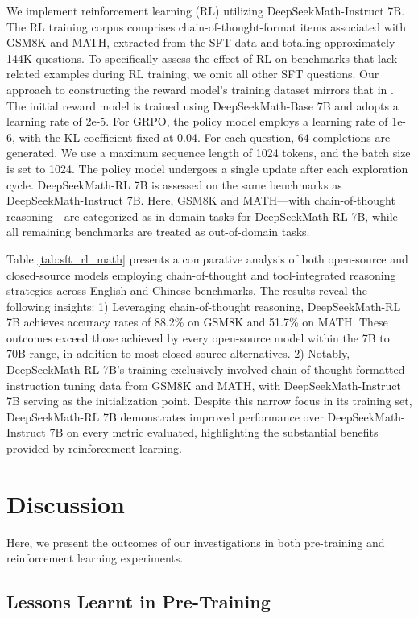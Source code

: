 \begin{itemize}[topsep=0pt]
\begin{itemize}[topsep=0pt]
We implement reinforcement learning (RL) utilizing DeepSeekMath-Instruct 7B. The RL training corpus comprises chain-of-thought-format items associated with GSM8K and MATH, extracted from the SFT data and totaling approximately 144K questions. To specifically assess the effect of RL on benchmarks that lack related examples during RL training, we omit all other SFT questions. Our approach to constructing the reward model's training dataset mirrors that in \citep{wang2023math}. The initial reward model is trained using DeepSeekMath-Base 7B and adopts a learning rate of 2e-5. For GRPO, the policy model employs a learning rate of 1e-6, with the KL coefficient fixed at 0.04. For each question, $64$ completions are generated. We use a maximum sequence length of 1024 tokens, and the batch size is set to 1024. The policy model undergoes a single update after each exploration cycle. DeepSeekMath-RL 7B is assessed on the same benchmarks as DeepSeekMath-Instruct 7B. Here, GSM8K and MATH—with chain-of-thought reasoning—are categorized as in-domain tasks for DeepSeekMath-RL 7B, while all remaining benchmarks are treated as out-of-domain tasks.

Table \ref{tab:sft_rl_math} presents a comparative analysis of both open-source and closed-source models employing chain-of-thought and tool-integrated reasoning strategies across English and Chinese benchmarks. The results reveal the following insights: 1) Leveraging chain-of-thought reasoning, DeepSeekMath-RL 7B achieves accuracy rates of 88.2\% on GSM8K and 51.7\% on MATH. These outcomes exceed those achieved by every open-source model within the 7B to 70B range, in addition to most closed-source alternatives. 2) Notably, DeepSeekMath-RL 7B’s training exclusively involved chain-of-thought formatted instruction tuning data from GSM8K and MATH, with DeepSeekMath-Instruct 7B serving as the initialization point. Despite this narrow focus in its training set, DeepSeekMath-RL 7B demonstrates improved performance over DeepSeekMath-Instruct 7B on every metric evaluated, highlighting the substantial benefits provided by reinforcement learning.

\section{Discussion}
Here, we present the outcomes of our investigations in both pre-training and reinforcement learning experiments.

\subsection{Lessons Learnt in Pre-Training}


\end{itemize}
\end{itemize}
